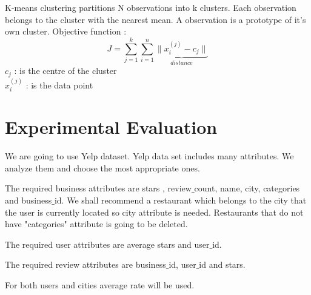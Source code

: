 \documentclass{article} %
\begin{document}
K-means clustering partitions N observations into k clusters. Each observation belongs to the cluster with the nearest mean. A observation is a prototype of it's own cluster. Objective function :
$$ J = \sum^{k}_{j=1}\sum^{n}_{i=1}\underbrace{\|x_{i}^{(j)}-c_{j}\|}_{distance}$$
$c_{j}$ : is the centre of the cluster\\
$x_{i}^{(j)}$ : is the data point\\

\section{Experimental Evaluation}

We are going to use Yelp dataset. Yelp data set includes many attributes. We analyze them and choose the most appropriate ones. 

The required business attributes are stars , review$\_$count, name, city, categories and business$\_$id. We shall recommend a restaurant  which belongs to the city that the user is currently located so city attribute is needed. Restaurants that do not have "categories" attribute is going to be deleted.  


The required user attributes are average stars and user$\_$id. 


The required review attributes are business$\_$id, user$\_$id and stars.

For both users and cities average rate will be used. 
\end{document}
